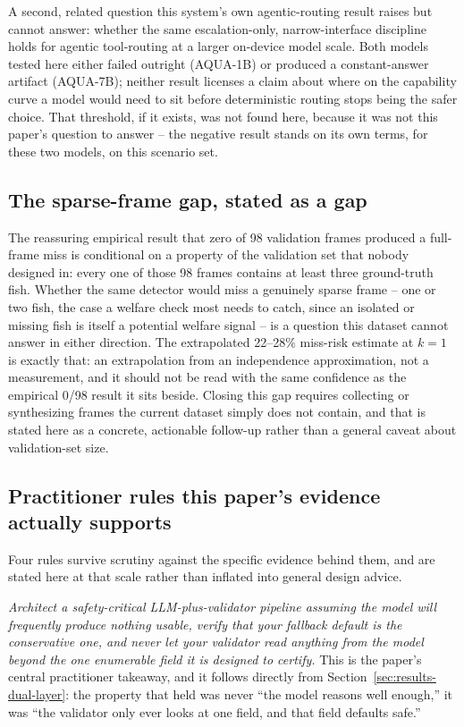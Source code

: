 A second, related question this system's own agentic-routing result raises but cannot answer:
whether the same escalation-only, narrow-interface discipline holds for agentic tool-routing at a
larger on-device model scale. Both models tested here either failed outright (AQUA-1B) or produced
a constant-answer artifact (AQUA-7B); neither result licenses a claim about where on the capability
curve a model would need to sit before deterministic routing stops being the safer choice. That
threshold, if it exists, was not found here, because it was not this paper's question to answer --
the negative result stands on its own terms, for these two models, on this scenario set.

\subsection{The sparse-frame gap, stated as a gap}

The reassuring empirical result that zero of 98 validation frames produced a full-frame miss is
conditional on a property of the validation set that nobody designed in: every one of those 98
frames contains at least three ground-truth fish. Whether the same detector would miss a genuinely
sparse frame -- one or two fish, the case a welfare check most needs to catch, since an isolated or
missing fish is itself a potential welfare signal -- is a question this dataset cannot answer in
either direction. The extrapolated 22--28\% miss-risk estimate at $k=1$ is exactly that: an
extrapolation from an independence approximation, not a measurement, and it should not be read
with the same confidence as the empirical 0/98 result it sits beside. Closing this gap requires
collecting or synthesizing frames the current dataset simply does not contain, and that is stated
here as a concrete, actionable follow-up rather than a general caveat about validation-set size.

\subsection{Practitioner rules this paper's evidence actually supports}

Four rules survive scrutiny against the specific evidence behind them, and are stated here at that
scale rather than inflated into general design advice.

\emph{Architect a safety-critical LLM-plus-validator pipeline assuming the model will frequently
produce nothing usable, verify that your fallback default is the conservative one, and never let
your validator read anything from the model beyond the one enumerable field it is designed to
certify.} This is the paper's central practitioner takeaway, and it follows directly from
Section~\ref{sec:results-dual-layer}: the property that held was never ``the model reasons well
enough,'' it was ``the validator only ever looks at one field, and that field defaults safe.''

